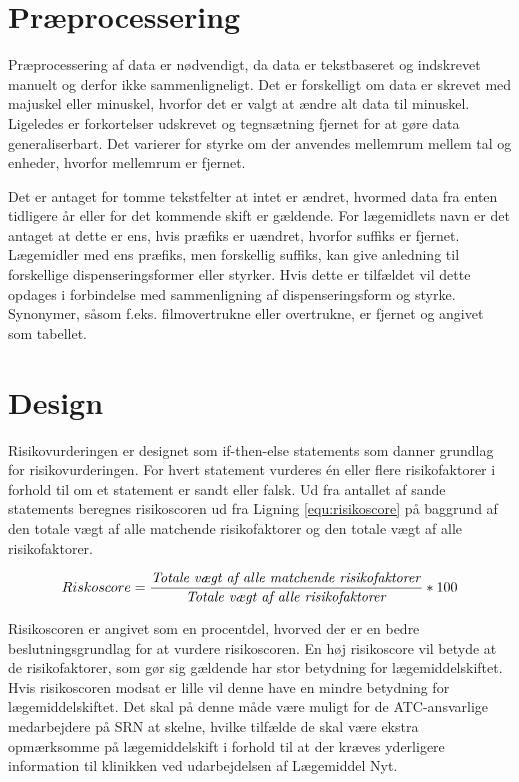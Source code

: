 \section{Præprocessering}
Præprocessering af data er nødvendigt, da data er tekstbaseret og indskrevet manuelt og derfor ikke sammenligneligt. Det er forskelligt om data er skrevet med majuskel eller minuskel, hvorfor det er valgt at ændre alt data til minuskel. Ligeledes er forkortelser udskrevet og tegnsætning fjernet for at gøre data generaliserbart. Det varierer for styrke om der anvendes mellemrum mellem tal og enheder, hvorfor mellemrum er fjernet.

Det er antaget for tomme tekstfelter at intet er ændret, hvormed data fra enten tidligere år eller for det kommende skift er gældende. For lægemidlets navn er det antaget at dette er ens, hvis præfiks er uændret, hvorfor suffiks er fjernet. Lægemidler med ens præfiks, men forskellig suffiks, kan give anledning til forskellige dispenseringsformer eller styrker. Hvis dette er tilfældet vil dette opdages i forbindelse med sammenligning af dispenseringsform og styrke. Synonymer, såsom f.eks. filmovertrukne eller overtrukne, er fjernet og angivet som tabellet. 

\section{Design}
Risikovurderingen er designet som if-then-else statements som danner grundlag for risikovurderingen. For hvert statement vurderes én eller flere risikofaktorer i forhold til om et statement er sandt eller falsk. Ud fra antallet af sande statements beregnes risikoscoren ud fra Ligning \ref{equ:risikoscore} på baggrund af den totale vægt af alle matchende risikofaktorer og den totale vægt af alle risikofaktorer.

\begin{equation}  \label{equ:risikoscore}
Riskoscore = \frac{\mbox{\textit{Totale vægt af alle matchende risikofaktorer}}}{\mbox{\textit{Totale vægt af alle risikofaktorer}}} * 100
\end{equation}

Risikoscoren er angivet som en procentdel, hvorved der er en bedre beslutningsgrundlag for at vurdere risikoscoren. En høj risikoscore vil betyde at de risikofaktorer, som gør sig gældende har stor betydning for lægemiddelskiftet. Hvis risikoscoren modsat er lille vil denne have en mindre betydning for lægemiddelskiftet. Det skal på denne måde være muligt for de ATC-ansvarlige medarbejdere på SRN at skelne, hvilke tilfælde de skal være ekstra opmærksomme på lægemiddelskift i forhold til at der kræves yderligere information til klinikken ved udarbejdelsen af Lægemiddel Nyt.  

